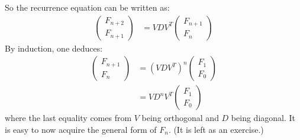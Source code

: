 \documentclass{beamer}
\begin{document}
\begin{frame}
    So the recurrence equation can be written as:
        \begin{align*}
            \begin{pmatrix}
                F_{n+2} \\
                F_{n+1}
            \end{pmatrix}
            &= 
            V D V^T
            \begin{pmatrix}
                F_{n+1} \\
                F_n
            \end{pmatrix}
        \end{align*}
        {
            By induction, one deduces:
            \begin{align*}
                \begin{pmatrix}
                    F_{n+1} \\
                    F_n
                \end{pmatrix}
                &=
                \left( VDV^T \right)^{n}
                \begin{pmatrix}
                    F_{1} \\
                    F_{0}
                \end{pmatrix}
                \\
                &= 
                V D^n V^T
                \begin{pmatrix}
                    F_{1} \\
                    F_{0}
                \end{pmatrix}
            \end{align*}
            where the last equality comes from $V$ being orthogonal and $D$ being diagonal.
        }
        {
            It is easy to now acquire the general form of $F_n$.
            (It is left as an exercise.)
        }
\end{frame}
\end{document}
